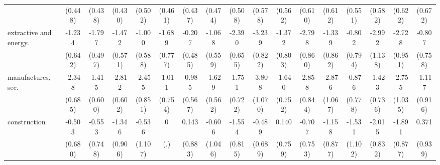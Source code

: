 {\begin{tabular}{l*{16}{c}}
                    &     (0.448)         &     (0.438)         &     (0.430)         &     (0.502)         &     (0.461)         &     (0.437)         &     (0.474)         &     (0.508)         &     (0.578)         &     (0.562)         &     (0.610)         &     (0.612)         &     (0.551)         &     (0.582)         &     (0.622)         &     (0.672)         \\
[1em]
extractive and energy.&      -1.234         &      -1.797\sym{***}&      -1.472\sym{**} &      -1.000         &      -1.689\sym{*}  &      -0.207         &      -1.068         &      -2.390\sym{***}&      -3.239\sym{***}&      -1.372         &      -2.798\sym{**} &      -1.339         &      -0.802         &      -2.992\sym{**} &      -2.728\sym{**} &      -0.807         \\
                    &     (0.642)         &     (0.497)         &     (0.571)         &     (0.588)         &     (0.777)         &     (0.485)         &     (0.559)         &     (0.655)         &     (0.822)         &     (0.803)         &     (0.860)         &     (0.862)         &     (0.794)         &     (1.138)         &     (0.951)         &     (0.758)         \\
[1em]
manufactures, sec.  &      -2.348\sym{***}&      -1.415\sym{*}  &      -2.812\sym{***}&      -2.455\sym{**} &      -1.011         &      -0.985         &      -1.629\sym{**} &      -1.751\sym{*}  &      -3.808\sym{***}&      -1.640\sym{*}  &      -2.858\sym{***}&      -2.876\sym{**} &      -0.876         &      -1.423         &      -2.755\sym{**} &      -1.117         \\
                    &     (0.685)         &     (0.600)         &     (0.602)         &     (0.851)         &     (0.754)         &     (0.567)         &     (0.562)         &     (0.722)         &     (1.070)         &     (0.752)         &     (0.844)         &     (1.067)         &     (0.778)         &     (0.736)         &     (1.035)         &     (0.916)         \\
[1em]
construction        &      -0.503         &      -0.553         &      -1.346         &      -0.536         &           0         &       0.143         &      -0.606         &      -1.554         &      -0.489         &       0.140         &      -0.707         &      -1.158         &      -1.531         &      -2.015\sym{*}  &      -1.891\sym{*}  &       0.371         \\
                    &     (0.680)         &     (0.748)         &     (0.906)         &     (1.107)         &         (.)         &     (0.883)         &     (1.046)         &     (0.815)         &     (0.689)         &     (0.759)         &     (0.753)         &     (0.877)         &     (1.102)         &     (0.832)         &     (0.877)         &     (0.939)         \\

\end{tabular}}
